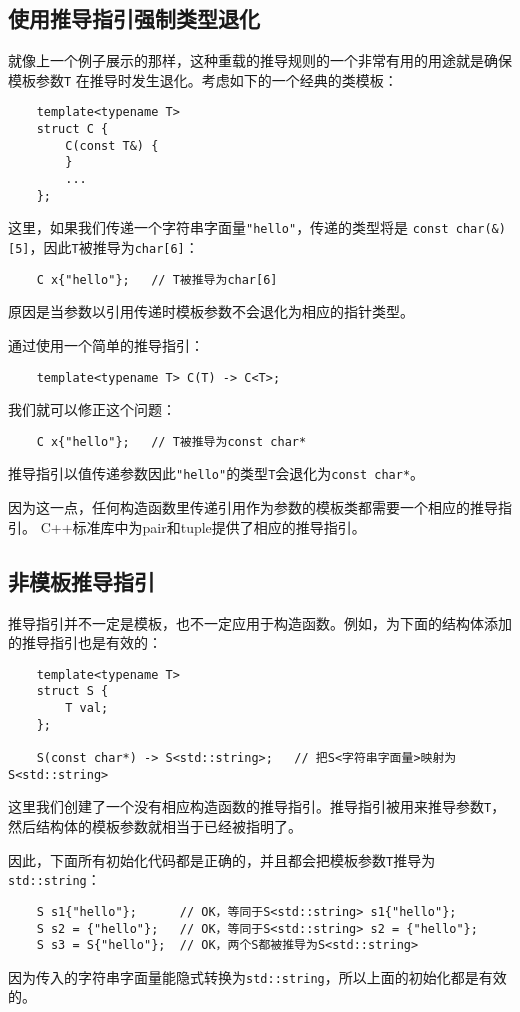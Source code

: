 \subsection{使用推导指引强制类型退化}\label{ch9.2.1}
就像上一个例子展示的那样，这种重载的推导规则的一个非常有用的用途就是确保模板参数\texttt{T}
在推导时发生退化。考虑如下的一个经典的类模板：
\begin{lstlisting}
    template<typename T>
    struct C {
        C(const T&) {
        }
        ...
    };
\end{lstlisting}
这里，如果我们传递一个字符串字面量\texttt{"hello"}，传递的类型将是
\texttt{const char(\&)[5]}，因此\texttt{T}被推导为\texttt{char[6]}：
\begin{lstlisting}
    C x{"hello"};   // T被推导为char[6]
\end{lstlisting}
原因是当参数以引用传递时模板参数不会退化为相应的指针类型。

通过使用一个简单的推导指引：
\begin{lstlisting}
    template<typename T> C(T) -> C<T>;
\end{lstlisting}
我们就可以修正这个问题：
\begin{lstlisting}
    C x{"hello"};   // T被推导为const char*
\end{lstlisting}
推导指引以值传递参数因此\texttt{"hello"}的类型\texttt{T}会退化为\texttt{const char*}。

因为这一点，任何构造函数里传递引用作为参数的模板类都需要一个相应的推导指引。
C++标准库中为pair和tuple提供了相应的推导指引。

\subsection{非模板推导指引}
推导指引并不一定是模板，也不一定应用于构造函数。例如，为下面的结构体添加的推导指引也是有效的：
\begin{lstlisting}
    template<typename T>
    struct S {
        T val;
    };

    S(const char*) -> S<std::string>;   // 把S<字符串字面量>映射为S<std::string>
\end{lstlisting}
这里我们创建了一个没有相应构造函数的推导指引。推导指引被用来推导参数\texttt{T}，
然后结构体的模板参数就相当于已经被指明了。

因此，下面所有初始化代码都是正确的，并且都会把模板参数\texttt{T}推导为\texttt{std::string}：
\begin{lstlisting}
    S s1{"hello"};      // OK，等同于S<std::string> s1{"hello"};
    S s2 = {"hello"};   // OK，等同于S<std::string> s2 = {"hello"};
    S s3 = S{"hello"};  // OK，两个S都被推导为S<std::string>
\end{lstlisting}
因为传入的字符串字面量能隐式转换为\texttt{std::string}，所以上面的初始化都是有效的。

